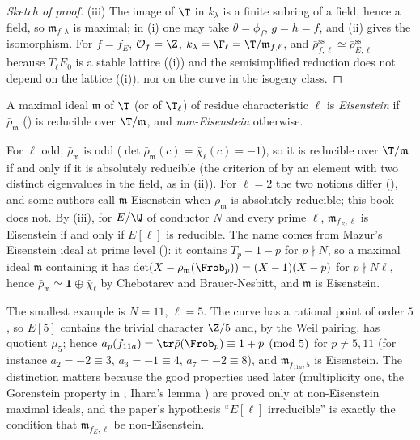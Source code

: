 \begin{proof}[Sketch of proof]
(iii) The image of $\T$ in $k_\lambda$ is a finite subring of a field, hence a field, so $\mathfrak m_{f,\lambda}$ is maximal; in (i) one may take $\theta=\phi_f$, $g=h=f$, and (ii) gives the
isomorphism. For $f=f_E$, $\mathcal{O}_f=\Z$, $k_\lambda=\F_\ell=\T/\mathfrak m_{f,\ell}$, and $\bar\rho^{\mathrm{ss}}_{f,\ell}\simeq\bar\rho^{\mathrm{ss}}_{E,\ell}$ because $T_\ell E_0$ is a stable lattice
((i)) and the semisimplified reduction does not depend on the lattice ((i)), nor on the curve in the
isogeny class.
\end{proof}

\begin{definition}\label{def:modgalrep:eisenstein}
A maximal ideal $\mathfrak m$ of $\T$ (or of $\T_\ell$) of residue characteristic $\ell$ is \emph{Eisenstein} if $\bar\rho_{\mathfrak m}$ () is reducible over
$\T/\mathfrak m$, and \emph{non-Eisenstein} otherwise.
\end{definition}

For $\ell$ odd, $\bar\rho_{\mathfrak m}$ is odd ($\det\bar\rho_{\mathfrak m}(c)=\bar\chi_\ell(c)=-1$), so it is reducible over $\T/\mathfrak m$ if and only if it is absolutely reducible (the criterion of
 by an element with two distinct eigenvalues in the field, as in (ii)). For $\ell=2$ the two notions differ
(), and some authors call $\mathfrak m$ Eisenstein when $\bar\rho_{\mathfrak m}$ is absolutely reducible; this book does not. By (iii),
for $E/\Q$ of conductor $N$ and every prime $\ell$, $\mathfrak m_{f_E,\ell}$ is Eisenstein if and only if $E[\ell]$ is reducible. The name comes from Mazur's Eisenstein ideal at prime level
(): it contains $T_p-1-p$ for $p\nmid N$, so a maximal ideal $\mathfrak m$ containing it has $\det(X-\bar\rho_{\mathfrak m}(\Frob_p))=(X-1)(X-p)$ for $p\nmid N\ell$, hence
$\bar\rho_{\mathfrak m}\simeq\mathbf 1\oplus\bar\chi_\ell$ by Chebotarev and Brauer-Nesbitt, and $\mathfrak m$ is Eisenstein.

The smallest example is $N=11$, $\ell=5$. The curve  has a rational point of order $5$, so $E[5]$ contains the trivial character $\Z/5$ and, by the Weil
pairing, has quotient $\mu_5$; hence $a_p(f_{11a})=\tr\bar\rho(\Frob_p)\equiv1+p\pmod5$ for $p\ne5,11$ (for instance $a_2=-2\equiv3$, $a_3=-1\equiv4$, $a_7=-2\equiv8$), and $\mathfrak m_{f_{11a},5}$
is Eisenstein. The distinction matters because the good properties used later (multiplicity one, the Gorenstein property in , Ihara's lemma
) are proved only at non-Eisenstein maximal ideals, and the paper's hypothesis ``$E[\ell]$ irreducible'' is exactly the condition that
$\mathfrak m_{f_E,\ell}$ be non-Eisenstein.

